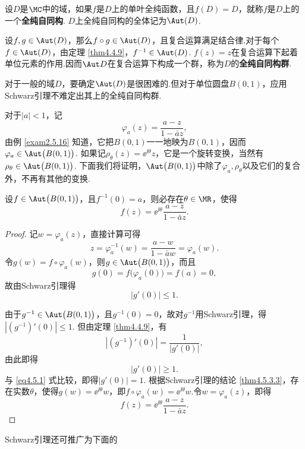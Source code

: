 \begin{definition}\label{def4.5.4}
设$D$是$\MC$中的域，如果$f$是$D$上的单叶全纯函数，且$f(D)=D$，就称$f$是$D$上的一个\textbf{全纯自同构}. $D$上全纯自同构的全体记为$\Aut(D)$.
\end{definition}

设$f,g\in \Aut(D)$，那么$f\circ g\in \Aut(D)$，且复合运算满足结合律.对于每个$f\in\Aut(D)$，由定理 \ref{thm4.4.9}，$f^{-1}\in\Aut(D)$. $f(z)=z$在复合运算下起着单位元素的作用.因而$\Aut D$在复合运算下构成一个群，称为$D$的\textbf{全纯自同构群}.

对于一般的域$D$，要确定$\Aut(D)$是很困难的.但对于单位圆盘$B(0,1)$，应用Schwarz引理不难定出其上的全纯自同构群.

对于$|a|<1$，记
\[\varphi_a(z)=\frac{a-z}{1-\bar az},\]
由例 \ref{exam2.5.16} 知道，它把$B(0,1)$一一地映为$B(0,1)$，因而$\varphi_a\in\Aut\big(B(0,1)\big)$. 如果记$\rho_\theta(z)=\ee^{\ii\theta}z$，它是一个旋转变换，当然有$\rho_\theta\in\Aut\big(B(0,1)\big)$. 下面我们将证明，$\Aut\big(B(0,1)\big)$中除了$\varphi_a,\rho_\theta$以及它们的复合外，不再有其他的变换.
\begin{theorem}\label{thm4.5.5}
设$f\in \Aut\big(B(0,1)\big)$，且$f^{-1}(0)=a$，则必存在$\theta\in\MR$，使得
\[f(z)=\ee^{\ii\theta}\frac{a-z}{1-\bar az}.\]
\end{theorem}
\begin{proof}
记$w=\varphi_a(z)$，直接计算可得
\[z=\varphi_a^{-1}(w)=\frac{a-w}{1-\bar aw}=\varphi_a(w).\]
令$g(w)=f\circ \varphi_a(w)$，则$g\in\Aut\big(B(0,1)\big)$，而且
\[g(0)=f\big(\varphi_a(0)\big)=f(a)=0,\]
故由Schwarz引理得
\begin{equation}\label{eq4.5.1}
|g'(0)|\le1.
\end{equation}

由于$g^{-1}\in\Aut\big(B(0,1)\big)$，且$g^{-1}(0)=0$，故对$g^{-1}$用Schwarz引理，得$|(g^{-1})'(0)|\le1$. 但由定理 \ref{thm4.4.9}，有
\[|(g^{-1})'(0)|=\frac1{|g'(0)|},\]
由此即得
\[|g'(0)|\ge1.\]
与 \eqref{eq4.5.1} 式比较，即得$|g'(0)|=1$. 根据Schwarz引理的结论 \ref{thm4.5.3.3}，存在实数$\theta$，使得$g(w)=\ee^{\ii\theta}w$，即$f\circ\varphi_a(w)=\ee^{\ii\theta}w$.令$w=\varphi_a(z)$，即得
\begin{equation*}
f(z)=\ee^{\ii\theta}\frac{a-z}{1-\bar az}.
\end{equation*}
\end{proof}

Schwarz引理还可推广为下面的

